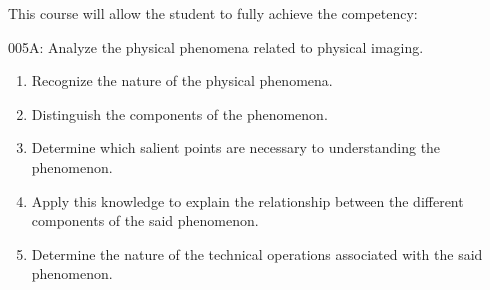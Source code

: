 {This course will allow the student to fully achieve the competency:

005A: Analyze the physical phenomena related to physical imaging.
\begin{enumerate}
\item Recognize the nature of the physical phenomena.
\item Distinguish the components of the phenomenon.
\item Determine which salient points are necessary to understanding the phenomenon.
\item Apply this knowledge to explain the relationship between the different components of the said  phenomenon.
\item Determine the nature of the technical operations associated with the said phenomenon.
\end{enumerate}
}
